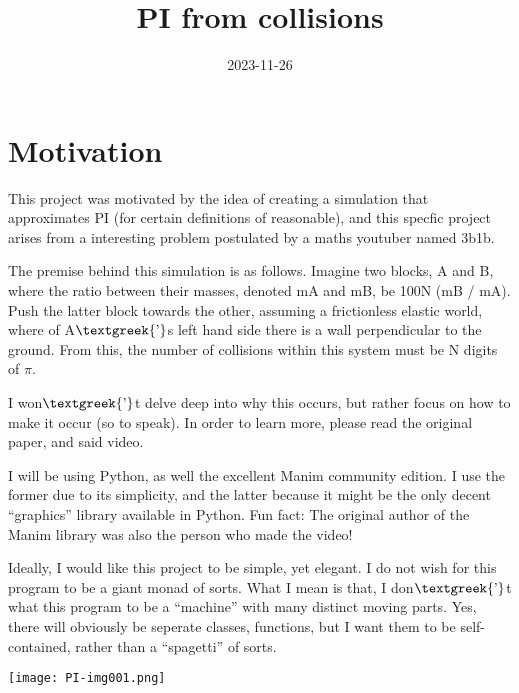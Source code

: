 \documentclass{article}
\date{2023-11-26}
\begin{document}
\bigskip


\bigskip

\title{PI from collisions}
\maketitle


\bigskip

\section{Motivation}
This project was motivated by the idea of creating a simulation that approximates PI (for certain definitions of
reasonable), and this specfic project arises from a interesting problem postulated by a maths youtuber named 3b1b.


\bigskip

The premise behind this simulation is as follows. Imagine two blocks, A and B, where the ratio between their masses,
denoted mA and mB, be 100N (mB / mA). Push the latter block towards the other, assuming a frictionless elastic world,
where of A$\text{\textgreek{’}}$s left hand side there is a wall perpendicular to the ground. From this, the number of
collisions within this system must be N digits of $\pi $.


\bigskip

I won$\text{\textgreek{’}}$t delve deep into why this occurs, but rather focus on how to make it occur (so to speak). In
order to learn more, please read the original paper, and said video.


\bigskip

I will be using Python, as well the excellent Manim community edition. I use the former due to its simplicity, and the
latter because it might be the only decent “graphics” library available in Python. Fun fact: The original author of the
Manim library was also the person who made the video!


\bigskip

Ideally, I would like this project to be simple, yet elegant. I do not wish for this program to be a giant monad of
sorts. What I mean is that, I don$\text{\textgreek{’}}$t what this program to be a “machine” with many distinct moving
parts. Yes, there will obviously be seperate classes, functions, but I want them to be self-contained, rather than a
“spagetti” of sorts.

 \texttt{[image: PI-img001.png]} 


\bigskip
\end{document}
